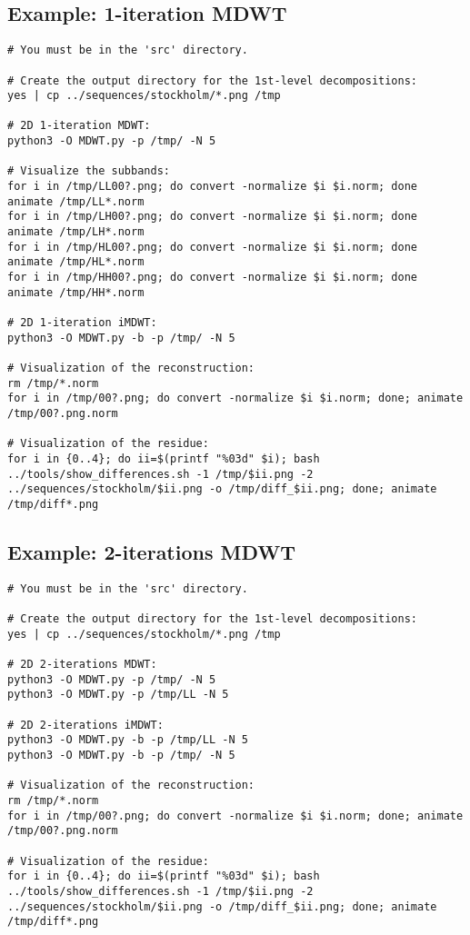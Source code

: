 \subsection*{Example: 1-iteration MDWT}
\begin{verbatim}
# You must be in the 'src' directory.

# Create the output directory for the 1st-level decompositions:
yes | cp ../sequences/stockholm/*.png /tmp

# 2D 1-iteration MDWT:
python3 -O MDWT.py -p /tmp/ -N 5

# Visualize the subbands:
for i in /tmp/LL00?.png; do convert -normalize $i $i.norm; done
animate /tmp/LL*.norm
for i in /tmp/LH00?.png; do convert -normalize $i $i.norm; done
animate /tmp/LH*.norm
for i in /tmp/HL00?.png; do convert -normalize $i $i.norm; done
animate /tmp/HL*.norm
for i in /tmp/HH00?.png; do convert -normalize $i $i.norm; done
animate /tmp/HH*.norm

# 2D 1-iteration iMDWT:
python3 -O MDWT.py -b -p /tmp/ -N 5

# Visualization of the reconstruction:
rm /tmp/*.norm
for i in /tmp/00?.png; do convert -normalize $i $i.norm; done; animate /tmp/00?.png.norm

# Visualization of the residue:
for i in {0..4}; do ii=$(printf "%03d" $i); bash ../tools/show_differences.sh -1 /tmp/$ii.png -2 ../sequences/stockholm/$ii.png -o /tmp/diff_$ii.png; done; animate /tmp/diff*.png
\end{verbatim}

\subsection*{Example: 2-iterations MDWT}
\begin{verbatim}
# You must be in the 'src' directory.

# Create the output directory for the 1st-level decompositions:
yes | cp ../sequences/stockholm/*.png /tmp

# 2D 2-iterations MDWT:
python3 -O MDWT.py -p /tmp/ -N 5
python3 -O MDWT.py -p /tmp/LL -N 5

# 2D 2-iterations iMDWT:
python3 -O MDWT.py -b -p /tmp/LL -N 5
python3 -O MDWT.py -b -p /tmp/ -N 5

# Visualization of the reconstruction:
rm /tmp/*.norm
for i in /tmp/00?.png; do convert -normalize $i $i.norm; done; animate /tmp/00?.png.norm

# Visualization of the residue:
for i in {0..4}; do ii=$(printf "%03d" $i); bash ../tools/show_differences.sh -1 /tmp/$ii.png -2 ../sequences/stockholm/$ii.png -o /tmp/diff_$ii.png; done; animate /tmp/diff*.png
\end{verbatim}

